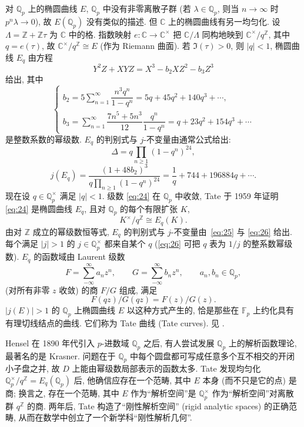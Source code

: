 对 $\mathbb{Q}_p$ 上的椭圆曲线 $E$, $\mathbb{Q}_p$ 中没有非零离散子群 (若 $\lambda\in\mathbb{Q}_p$, 则当 $n\to\infty$ 时 $p^n\lambda\to 0$), 故 $E(\mathbb{Q}_p)$ 没有类似的描述. 但 $\mathbb{C}$ 上的椭圆曲线有另一均匀化. 设 $\Lambda = \mathbb{Z} + \mathbb{Z}\tau$ 为 $\mathbb{C}$ 中的格. 指数映射 $e\colon\mathbb{C}\to\mathbb{C}^{\times}$ 把 $\mathbb{C}/\Lambda$ 同构地映到 $\mathbb{C}^{\times}/q^{\mathbb{Z}}$, 其中 $q = e(\tau)$, 故 $\mathbb{C}^{\times}/q^{\mathbb{Z}}\cong E$ (作为 Riemann 曲面). 若 $\Im(\tau) > 0$, 则 $|q| < 1$, 椭圆曲线 $E_q$ 由方程
\begin{equation} \label{eq:23}
Y^2Z + XYZ = X^3 - b_2XZ^2 - b_3Z^3
\tag{23}
\end{equation}
给出, 其中
\begin{equation} \label{eq:24}
\begin{cases}
b_2 = 5\sum\limits_{n=1}^{\infty}\dfrac{n^3q^n}{1-q^n} = 5q + 45q^2 + 140q^3 + \cdots,\\
b_3 = \sum\limits_{n=1}^{\infty}\dfrac{7n^5 + 5n^3}{12}\dfrac{q^n}{1-q^n} = q + 23q^2 + 154q^3 + \cdots
\end{cases}
\tag{24}
\end{equation}
是整数系数的幂级数. $E_q$ 的判别式与 $j$-不变量由通常公式给出:
\begin{equation} \label{eq:25}
\Delta = q\prod_{n\ge 1}(1-q^n)^{24},
\tag{25}
\end{equation}
\begin{equation} \label{eq:26}
j(E_q) = \frac{(1+48b_2)^3}{q\prod_{n\ge 1}(1-q^n)^{24}} = \frac{1}{q} + 744 + 196884q + \cdots.
\tag{26}
\end{equation}
现在设 $q\in\mathbb{Q}_p^{\times}$ 满足 $|q| < 1$. 级数 \eqref{eq:24} 在 $\mathbb{Q}_p$ 中收敛, Tate 于 1959 年证明 \eqref{eq:24} 是椭圆曲线 $E_q$, 且对 $\mathbb{Q}_p$ 的每个有限扩张 $K$,
\[
K^{\times}/q^{\mathbb{Z}}\cong E_q(K).
\]
由对 $\mathbb{Z}$ 成立的幂级数恒等式, $E_q$ 的判别式与 $j$-不变量由~\eqref{eq:25} 与 \eqref{eq:26} 给出. 每个满足 $|j| > 1$ 的 $j\in\mathbb{Q}_p^{\times}$ 都来自某个 $q$ (\eqref{eq:26} 可把 $q$ 表为 $1/j$ 的整系数幂级数). $E_q$ 的函数域由 Laurent 级数
\[
F = \sum\limits_{-\infty}^{\infty}a_nz^n, \qquad G = \sum\limits_{-\infty}^{\infty}b_nz^n, \qquad a_n, b_n\in\mathbb{Q}_p,
\]
(对所有非零 $z$ 收敛) 的商 $F/G$ 组成, 满足
\[
F(qz)/G(qz) = F(z)/G(z).
\]
$|j(E)| > 1$ 的 $\mathbb{Q}_p$ 上椭圆曲线 $E$ 以这种方式产生的, 恰是那些在 $\mathbb{F}_p$ 上约化具有有理切线结点的曲线. 它们称为 Tate 曲线 (Tate curves). 见 \cite[Chap.~V]{silverman1994}.

\begin{remarkstar}
Hensel 在 1890 年代引入 $p$-进数域 $\mathbb{Q}_p$ 之后, 有人尝试发展 $\mathbb{Q}_p$ 上的解析函数理论, 最著名的是 Krasner. 问题在于 $\mathbb{Q}_p$ 中每个圆盘都可写成任意多个互不相交的开闭小子盘之并, 故 $D$ 上能由幂级数局部表示的函数太多. Tate 发现均匀化 $\mathbb{Q}_p^{\times}/q^{\mathbb{Z}} = E_q(\mathbb{Q}_p)$ 后, 他确信应存在一个范畴, 其中 $E$ 本身 (而不只是它的点) 是商; 换言之, 存在一个范畴, 其中 $E$ 作为``解析空间''是 $\mathbb{Q}_p^{\times}$ 作为``解析空间''对离散群 $q^{\mathbb{Z}}$ 的商. 两年后, Tate 构造了``刚性解析空间'' (rigid analytic spaces) 的正确范畴, 从而在数学中创立了一个新学科``刚性解析几何''.
\end{remarkstar}
